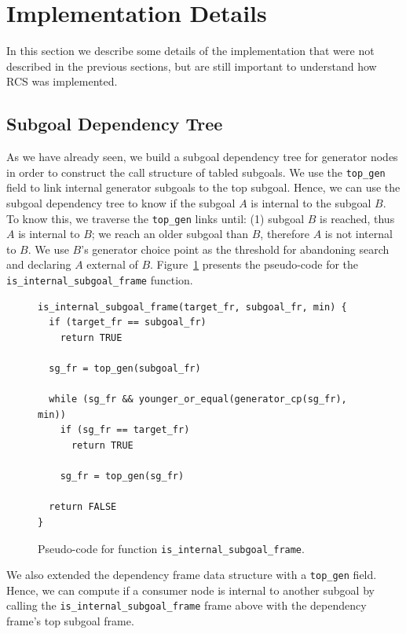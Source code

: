 \section{Implementation Details}

In this section we describe some details of the implementation that were not described
in the previous sections, but are still important to understand how RCS was implemented.

\subsection{Subgoal Dependency Tree}

As we have already seen, we build a subgoal dependency tree for generator nodes
in order to construct the call structure of tabled subgoals. We use the \texttt{top\_gen}
field to link internal generator subgoals to the top subgoal.
Hence, we can use the subgoal dependency tree to know if the subgoal $A$ is internal
to the subgoal $B$. To know this, we traverse the \texttt{top\_gen} links until:
(1) subgoal $B$ is reached, thus $A$ is internal to $B$; we reach an older subgoal
than $B$, therefore $A$ is not internal to $B$. We use $B$'s generator choice point
as the threshold for abandoning search and declaring $A$ external of $B$.
Figure~\ref{fig:is_internal_subgoal_frame} presents the pseudo-code for the
\texttt{is\_internal\_subgoal\_frame} function.

\begin{figure}[ht]
\begin{Verbatim}
is_internal_subgoal_frame(target_fr, subgoal_fr, min) {
  if (target_fr == subgoal_fr)
    return TRUE
  
  sg_fr = top_gen(subgoal_fr)
  
  while (sg_fr && younger_or_equal(generator_cp(sg_fr), min))
    if (sg_fr == target_fr)
      return TRUE
    
    sg_fr = top_gen(sg_fr)
  
  return FALSE
}
\end{Verbatim}
\caption{Pseudo-code for function \texttt{is\_internal\_subgoal\_frame}.}
\label{fig:is_internal_subgoal_frame}
\end{figure}

We also extended the dependency frame data structure with a \texttt{top\_gen} field.
Hence, we can compute if a consumer node is internal to another subgoal by calling
the \texttt{is\_internal\_subgoal\_frame} frame above with the dependency frame's top
subgoal frame.

